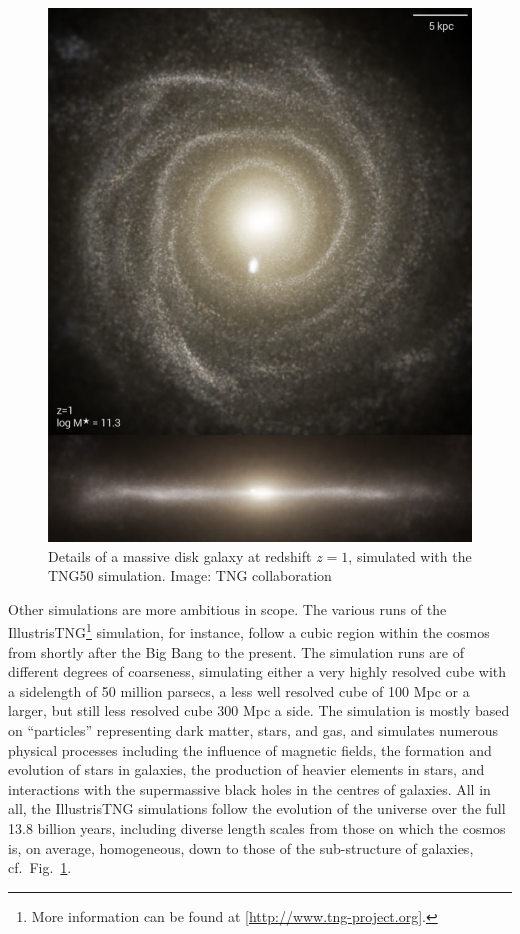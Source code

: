 \documentclass[twocolumn,apj]{openjournal}
\begin{document}
\begin{figure}[htbp]
\begin{center}
\includegraphics[width=\linewidth]{TNG-scales.jpg}
\caption{Details of a massive disk galaxy at redshift $z=1$, simulated with the TNG50 simulation. Image: TNG collaboration}
\label{TNG}
\end{center}
\end{figure}
Other simulations are more ambitious in scope. The various runs of the IllustrisTNG\footnote{More information can be found at [\href{http://www.tng-project.org}{http://www.tng-project.org}]. } simulation, for instance, follow a cubic region within the cosmos from shortly after the Big Bang to the present. The simulation runs are of different degrees of coarseness, simulating either a very highly resolved cube with a sidelength of 50 million parsecs, a less well resolved cube of 100 Mpc or a larger, but still less resolved cube 300 Mpc a side. The simulation is mostly based on ``particles'' representing dark matter, stars, and gas, and simulates numerous physical processes including the influence of magnetic fields, the formation and evolution of stars in galaxies, the production of heavier elements in stars, and interactions with the supermassive black holes in the centres of galaxies. All in all, the IllustrisTNG simulations follow the evolution of the universe over the full 13.8 billion years, including diverse length scales from those on which the cosmos is, on average, homogeneous, down to those of the sub-structure of galaxies, cf.~Fig.~\ref{TNG}.
\end{document}
